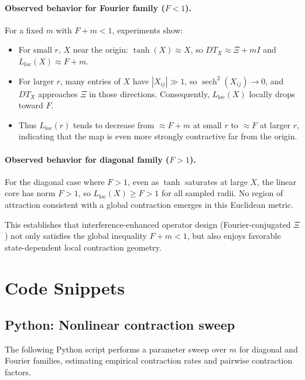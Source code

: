 \documentclass[11pt]{article}
\begin{document}
\paragraph{Observed behavior for Fourier family ($F<1$).}

For a fixed $m$ with $F+m<1$, experiments show:
\begin{itemize}
  \item For small $r$, $X$ near the origin: $\tanh(X)\approx X$, so $DT_X\approx \Xi + m I$ and $L_{\text{loc}}(X)\approx F + m$.
  \item For larger $r$, many entries of $X$ have $|X_{ij}|\gg 1$, so $\operatorname{sech}^2(X_{ij})\to 0$, and $DT_X$ approaches $\Xi$ in those directions. Consequently, $L_{\text{loc}}(X)$ locally drops toward $F$.
  \item Thus $L_{\text{loc}}(r)$ tends to decrease from $\approx F+m$ at small $r$ to $\approx F$ at larger $r$, indicating that the map is even more strongly contractive far from the origin.
\end{itemize}

\paragraph{Observed behavior for diagonal family ($F>1$).}

For the diagonal case where $F>1$, even as $\tanh$ saturates at large $X$, the linear core has norm $F>1$, so $L_{\text{loc}}(X)\geq F>1$ for all sampled radii. No region of attraction consistent with a global contraction emerges in this Euclidean metric.

This establishes that interference-enhanced operator design (Fourier-conjugated $\Xi$) not only satisfies the global inequality $F+m<1$, but also enjoys favorable state-dependent local contraction geometry.

\section{Code Snippets}

\subsection{Python: Nonlinear contraction sweep}

The following Python script performs a parameter sweep over $m$ for diagonal and Fourier families, estimating empirical contraction rates and pairwise contraction factors.
\end{document}
